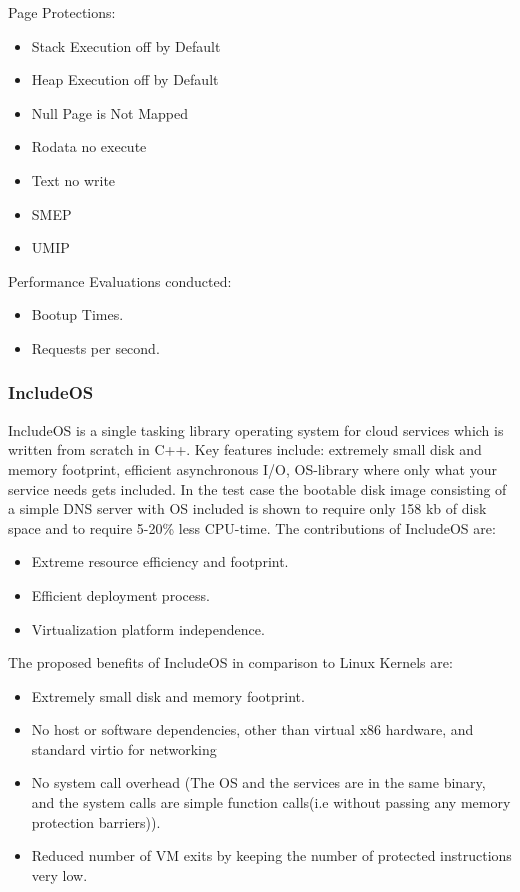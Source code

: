 Page Protections:

\begin{itemize}
  \item Stack Execution off by Default
  \item Heap Execution off by Default
  \item Null Page is Not Mapped
  \item Rodata no execute
  \item Text no write
\end{itemize}

\begin{itemize}
  \item SMEP
  \item UMIP
\end{itemize}

Performance Evaluations conducted:
\begin{itemize}
  \item Bootup Times.
  \item Requests per second.
\end{itemize}

\subsubsection{IncludeOS}
IncludeOS is a single tasking library operating system for 
cloud services which is written from scratch in C++. Key features include:
extremely small disk and memory footprint, efficient asynchronous I/O, 
OS-library where only what your service needs gets included.
In the test case the bootable disk image consisting
of a simple DNS server with OS included is shown
to require only 158 kb of disk space and to require
5-20\% less CPU-time.
The contributions of IncludeOS are:
\begin{itemize}
  \item Extreme resource efficiency and footprint.
  \item Efficient deployment process.
  \item Virtualization platform independence.
\end{itemize}
The proposed benefits of IncludeOS  in comparison to Linux Kernels are:
\begin{itemize}
  \item Extremely small disk and memory footprint.
  \item No host or software dependencies, other than
  virtual x86 hardware, and standard virtio for
  networking
  \item No system call overhead (The OS and the
  services are in the same binary, and the system calls
  are simple function calls(i.e without passing any
  memory protection barriers)).
  \item Reduced number of VM exits by keeping the
  number of protected instructions very low.
\end{itemize}

